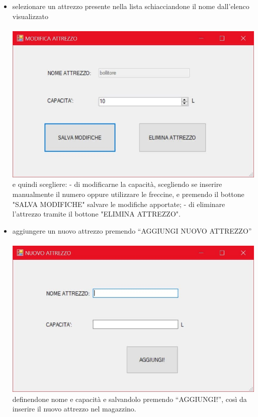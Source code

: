 \documentclass[a4paper, titlepage]{article}
\begin{document}
\begin{itemize}
    \item selezionare un attrezzo presente nella lista schiacciandone il nome dall'elenco visualizzato\\\\
    \includegraphics[scale=0.30]{Immagini/form/Form ModificaAtt.jpg}
    \\e quindi scegliere:
        \subitem - di modificarne la capacità, scegliendo se inserire manualmente il numero oppure utilizzare le freccine, e premendo il bottone "SALVA MODIFICHE" salvare le modifiche apportate;
        \subitem - di eliminare l'attrezzo tramite il bottone "ELIMINA ATTREZZO".
    \item aggiungere un nuovo attrezzo premendo “AGGIUNGI NUOVO ATTREZZO”\\\\
    \includegraphics[scale=0.30]{Immagini/form/Form AggiuntaAtt.jpg}
    \\definendone nome e capacità e salvandolo premendo “AGGIUNGI!”, così da inserire il nuovo attrezzo nel magazzino.
\end{itemize}
\end{document}
